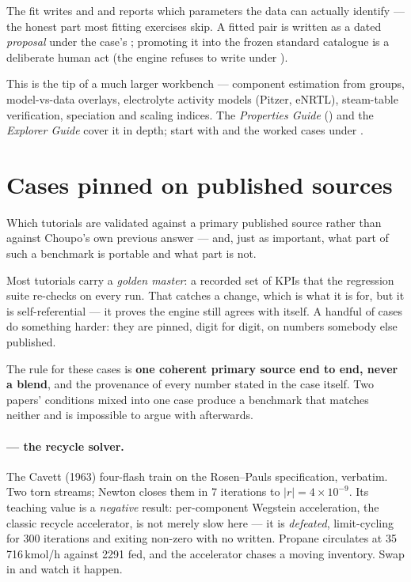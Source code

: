 \documentclass[11pt,a4paper]{article}
\begin{document}
The fit writes  and  and
reports which parameters the data can actually identify --- the honest
part most fitting exercises skip.  A fitted pair is written as a dated
\emph{proposal} under the case's ; promoting it into
the frozen standard catalogue is a deliberate human act (the engine
refuses to write under ).

This is the tip of a much larger workbench --- component estimation
from groups, model-vs-data overlays, electrolyte activity models
(Pitzer, eNRTL), steam-table verification, speciation and scaling
indices.  The \emph{Properties Guide} () and
the \emph{Explorer Guide} cover it in depth; start with
 and the worked cases under
.

\section{Cases pinned on published sources}\label{sec:references}

\begin{whatyoulllearn}
Which tutorials are validated against a primary published source rather
than against Choupo's own previous answer --- and, just as important, what
part of such a benchmark is portable and what part is not.
\end{whatyoulllearn}

Most tutorials carry a \emph{golden master}: a recorded set of KPIs that
the regression suite re-checks on every run.  That catches a change, which
is what it is for, but it is self-referential --- it proves the engine
still agrees with itself.  A handful of cases do something harder: they are
pinned, digit for digit, on numbers somebody else published.

\begin{keyidea}
The rule for these cases is \textbf{one coherent primary source end to
end, never a blend}, and the provenance of every number stated in the case
itself.  Two papers' conditions mixed into one case produce a benchmark
that matches neither and is impossible to argue with afterwards.
\end{keyidea}

\paragraph{ --- the recycle solver.}
The Cavett (1963) four-flash train on the Rosen--Pauls specification,
verbatim.  Two torn streams; Newton closes them in 7 iterations to
$|r| = 4\times10^{-9}$.  Its teaching value is a \emph{negative} result:
per-component Wegstein acceleration, the classic recycle accelerator, is
not merely slow here --- it is \emph{defeated}, limit-cycling for 300
iterations and exiting non-zero with no  written.  Propane
circulates at 35\,716\,kmol/h against 2291 fed, and the accelerator chases
a moving inventory.  Swap  in 
and watch it happen.
\end{document}
